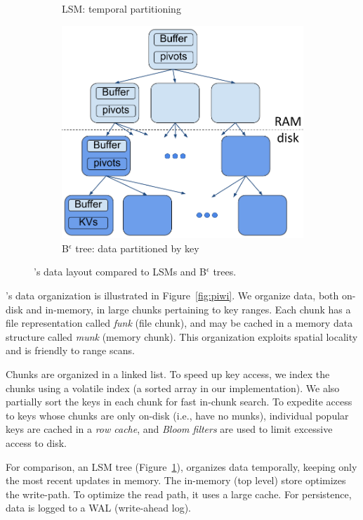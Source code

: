 \begin{figure}[tb]
\begin{subfigure}{0.3\linewidth}
\caption{LSM: temporal partitioning}
\label{fig:lsm}
\end{subfigure}
\hspace{1mm}
\begin{subfigure}{0.3\linewidth}
\includegraphics[width=\textwidth]{Bepsilon.png}
\caption{B$^\epsilon$  tree: data partitioned by key}
\label{fig:bepsilon}
\end{subfigure}
\caption{\sys's data layout compared to LSMs and B$^\epsilon$ trees.}
\label{fig:layout}
\end{figure}
\sys's data organization is illustrated in Figure~\ref{fig:piwi}. 
We organize data, both on-disk and in-memory, in large chunks pertaining to  key ranges.  
Each chunk has a file representation called  \emph{funk} (file chunk), and may be cached in a  memory data structure called \emph{munk} (memory chunk).
This organization exploits spatial locality and is friendly to range scans.

Chunks are organized in a linked list. To speed up key access, 
we index the chunks using a volatile index (a sorted array in our implementation).  
We also partially sort the keys in each chunk for fast in-chunk search.  
 To expedite access to  keys whose chunks are only on-disk  (i.e., have no munks), 
individual popular keys are cached in a \emph{row cache}, 
and \emph{Bloom filters} are used to limit excessive access to disk. 

For comparison, an LSM tree (Figure~\ref{fig:lsm}), organizes data temporally, keeping only the most recent updates in memory.
The in-memory (top level) store optimizes the write-path. To optimize the read path, it uses a large cache.   
For persistence, data is logged to a WAL (write-ahead log). 

